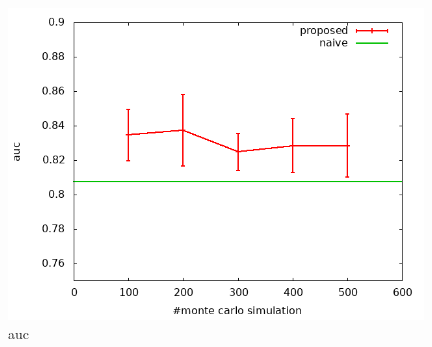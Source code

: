 \documentclass[a4paper,10.5pt]{article}           %
\begin{document}
\begin{figure}[htbp]
		\begin{center}
			\includegraphics[width=110mm]{../auc.png}
		\end{center}
		\caption{auc}
\end{figure}
\end{document}

